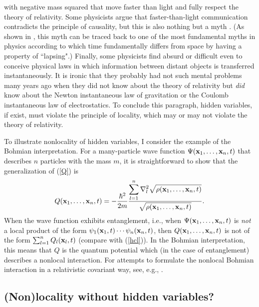 \documentclass[12pt]{article}
\begin{document}
with negative mass squared 
that move faster than light and fully respect the theory of relativity.
Some physicists argue that faster-than-light communication 
contradicts the principle of causality, but this is also 
nothing but a myth \cite{liberati,nikolcaus}. (As shown in 
\cite{nikolcaus}, this myth can be traced back to one of the 
most fundamental myths in physics according to which 
time fundamentally differs from space by having a property
of ``lapsing".)           
Finally, some physicists find absurd or difficult even to conceive 
physical laws in which information between distant objects is 
transferred instantaneously. It is ironic that they probably 
had not such mental problems many years ago when they did not know 
about the theory of relativity but {\em did} know about the 
Newton instantaneous law of gravitation or the Coulomb 
instantaneous law of electrostatics.  
To conclude this paragraph, hidden variables, if exist, must 
violate the principle of locality, which may or may not 
violate the theory of relativity. 

To illustrate nonlocality of hidden variables, 
I consider the example of the Bohmian interpretation.
For a many-particle wave function 
$\Psi({\bf x}_1,\ldots,{\bf x}_n,t)$ that describes $n$ 
particles with the mass $m$, it is 
straightforward to show that the generalization of (\ref{Q}) is
\begin{equation}\label{Qn}
Q({\bf x}_1,\ldots,{\bf x}_n,t)
= -\frac{\hbar^2}{2m} 
\displaystyle\frac{\displaystyle\sum_{l=1}^{n}
\nabla^2_l \sqrt{\rho({\bf x}_1,\ldots,{\bf x}_n,t)}}
{\sqrt{\rho({\bf x}_1,\ldots,{\bf x}_n,t)}} .
\end{equation}
When the wave function exhibits entanglement, i.e., 
when $\Psi({\bf x}_1,\ldots,{\bf x}_n,t)$ is {\em not}
a local product of the form 
$\psi_1({\bf x}_1,t)\cdots\psi_n({\bf x}_n,t)$, 
then $Q({\bf x}_1,\ldots,{\bf x}_n,t)$ is not 
of the form $\sum_{l=1}^{n}Q_l({\bf x}_l,t)$ (compare with
(\ref{hcl})). 
In the Bohmian interpretation, this means that
$Q$ is the quantum potential
which (in the case of entanglement) describes a nonlocal interaction.  
For attempts to formulate the nonlocal Bohmian interaction 
in a relativistic covariant way, see, e.g., \cite{durpra1,durpra2,
hort,nikolfpl3,nikddw,nikmft}.

\subsection{(Non)locality without hidden variables?}
\end{document}
